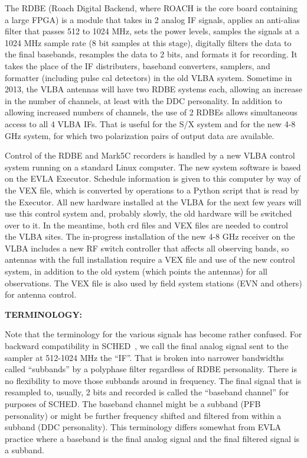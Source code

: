\documentclass{report}
\newcommand{\sched}{{\sc SCHED}}
\newcommand{\schedb}{{\sc SCHED~}}
\begin{document}
The RDBE (Roach Digital Backend, where ROACH is the core board
containing a large FPGA) is a module that takes in 2 analog IF
signals, applies an anti-alias filter that passes 512 to 1024 MHz,
sets the power levels, samples the signals at a 1024 MHz sample rate
(8 bit samples at this stage), digitally filters the data to the final
basebands, resamples the data to 2 bits, and formats it for recording.
It takes the place of the IF distributers, baseband converters,
samplers, and formatter (including pulse cal detectors) in the old
VLBA system.  Sometime in 2013, the VLBA antennas will have two RDBE
systems each, allowing an increase in the number of channels, at least
with the DDC personality.  In addition to allowing increased numbers
of channels, the use of 2 RDBEs allows simultaneous access to all
4 VLBA IFs.  That is useful for the S/X system and for the new 
4-8 GHz system, for which two polarization pairs of output data are
available.

Control of the RDBE and Mark5C recorders is handled by a new VLBA
control system running on a standard Linux computer.  The new system
software is based on the EVLA Executor.  Schedule information is given
to this computer by way of the VEX file, which is converted by
operations to a Python script that is read by the Executor.  All new
hardware installed at the VLBA for the next few years will use this
control system and, probably slowly, the old hardware will be switched
over to it.  In the meantime, both crd files and VEX files are
needed to control the VLBA sites.  The in-progress installation of the
new 4-8 GHz receiver on the VLBA includes a new RF switch controller 
that affects all observing bands, so antennas with the full installation
require a VEX file and use of the new control system, in addition to
the old system (which points the antennas) for all observations.  The
VEX file is also used by field system stations (EVN and others) for 
antenna control.

{\bf TERMINOLOGY:}

Note that the terminology for the various signals has become rather
confused.  For backward compatibility in \schedb, we call the final
analog signal sent to the sampler at 512-1024 MHz the ``IF''.  That is
broken into narrower bandwidths called ``subbands'' by a polyphase
filter regardless of RDBE personality.  There is no flexibility to
move those subbands around in frequency.  The final signal that is
resampled to, usually, 2 bits and recorded is called the ``baseband
channel'' for purposes of \sched.  The baseband channel might be a
subband (PFB personality) or might be further frequency shifted and
filtered from within a subband (DDC personality).  This terminology
differs somewhat from EVLA practice where a baseband is the final 
analog signal and the final filtered signal is a subband.
\end{document}
